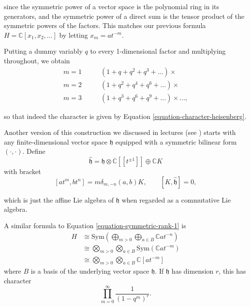 \noindent
since the symmetric power of a vector space
is the polynomial ring in its generators,
and the symmetric power of a direct sum
is the tensor product of the symmetric
powers of the factors.
This matches our previous formula
$H=\mathbb{C}[x_1,x_2,\ldots]$ by letting
$x_m=at^{-m}$.

Putting a dummy variably $q$ to every
1-dimensional
factor and multiplying throughout, we obtain
$$
\begin{aligned}
m=1\qquad &(1+q+q^2+q^3+\ldots)\times\\
m=2\qquad &(1+q^2+q^4+q^6+\ldots)\times\\
m=3\qquad
&(1+q^3+q^6+q^9+\ldots)\times\ldots,
\end{aligned}
$$

\noindent
so that indeed the character is given by
Equation \ref{equation-character-heisenberg}.

\medskip\noindent
Another version of this construction
we discussed in lectures
(see \cite[Section
3.1]{Jethro-vertex-algebras})
starts with any finite-dimensional vector
space $\mathfrak{h}$
equipped with a symmetric bilinear form
$(\cdot,\cdot)$.
Define
$$
\hat{\mathfrak{h}}=\mathfrak{h}\otimes\mathbb{C}[[t^{\pm 1}]]\oplus\mathbb{C}K
$$
with bracket
\begin{equation}
\label{equation-bracket-affine}
[at^m,bt^n]=m\delta_{m,-n}(a,b)K,\qquad
[K,\hat{\mathfrak{h}}]=0,
\end{equation}

\noindent
which is just the affine Lie algebra of
$\mathfrak{h}$ when
regarded as a commutative Lie algebra.

A similar formula to Equation
\ref{equation-symmetric-rank-1} is
\begin{equation}
\label{equation-symmetric}
\begin{aligned}
H&\cong\text{Sym}\left(\bigoplus_{m>0}\bigoplus_{a \in B}
\mathbb{C}at^{-n}\right)\\
&\cong\bigotimes_{m>0}\bigotimes_{a \in
B}\text{Sym}(\mathbb{C}at^{-m})\\
&\cong\bigotimes_{m>0}\bigotimes_{a \in
B}\mathbb{C}[at^{-m}]
\end{aligned}
\end{equation}
where $B$ is a basis of the underlying
vector space $\mathfrak{h}$.
If $\mathfrak{h}$ has dimension $r$, this
has character
\begin{equation}
\label{equation-character-rank-r}
\prod_{m=0}^\infty\frac{1}{(1-q^m)^r}.
\end{equation}

